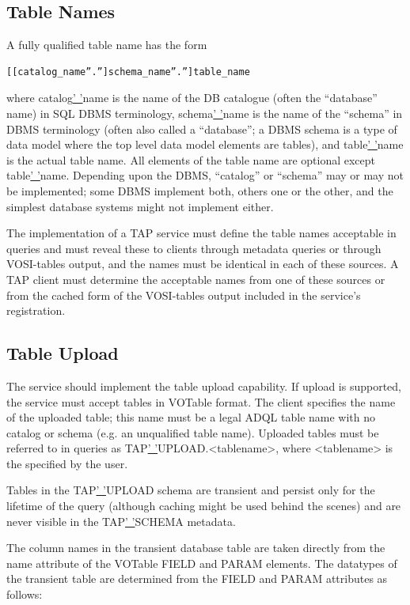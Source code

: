 \documentclass[11pt,a4paper]{ivoa}
\begin{document}
\subsection{Table Names}
A fully qualified table name has the form
\begin{verbatim}
[[catalog_name”.”]schema_name”.”]table_name
\end{verbatim}
where catalog\underline{' '}name is the name of the DB catalogue (often the 
“database” name) in SQL DBMS terminology, schema\underline{' '}name is the name 
of the “schema” in DBMS terminology (often also called a “database”; a DBMS 
schema is a type of data model where the top level data model elements are 
tables), and table\underline{' '}name is the actual table name.  All elements of 
the table name are optional except table\underline{' '}name.  Depending upon the 
DBMS, “catalog” or “schema” may or may not be implemented; some DBMS implement 
both, others one or the other, and the simplest database systems might not 
implement either.

The implementation of a TAP service must define the table names acceptable in 
queries and must reveal these to clients through metadata queries or through 
VOSI-tables output, and the names must be identical in each of these sources. A 
TAP client must determine the acceptable names from one of these sources or from 
the cached form of the VOSI-tables output included in the service's 
registration. 

\subsection{Table Upload}
The service should implement the table upload capability. If upload is 
supported,  the service must accept tables in VOTable format. The client 
specifies the name of the uploaded table; this name must be a legal ADQL table 
name with no catalog or schema (e.g. an unqualified table name). Uploaded tables 
must be referred to in queries as TAP\underline{' '}UPLOAD.<tablename>, where 
<tablename> is the specified by the user.

Tables in the TAP\underline{' '}UPLOAD schema are transient and 
persist only for the lifetime of the query (although caching might be used 
behind the scenes) and are never visible in the TAP\underline{' '}SCHEMA 
metadata.

The column names in the transient database table are taken directly from the 
name attribute of the VOTable FIELD and PARAM elements. The datatypes of the 
transient table are determined from the FIELD and PARAM attributes as follows:
\end{document}
